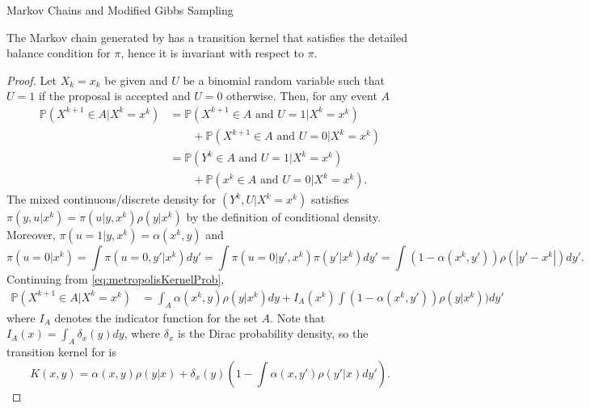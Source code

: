 \begin{chapter}{Markov Chains and Modified Gibbs Sampling}
\begin{prop} \label{prop:metropolisInvariance}
  The Markov chain generated by  has a transition kernel that satisfies the detailed balance condition for $\pi$, hence it is invariant with respect to $\pi$.
\end{prop}
\begin{proof}
Let $X_k=x_k$ be given and $U$ be a binomial random variable such that $U=1$ if the proposal is accepted and $U=0$ otherwise. 
Then, for any event $A$ 
\begin{align}
  \mathbb P\left( X^{k+1} \in A | X^k = x^k \right)
    &= \mathbb P\left( X^{k+1} \in A\text{ and } U = 1 |X^k=x^k \right) \nonumber\\
    &\quad\quad+ \mathbb P\left(X^{k+1} \in A\text{ and } U = 0| X^k=x^k \right) \nonumber \\
    &= \mathbb P\left( Y^k \in A\text{ and } U = 1 |X^k=x^k \right) \nonumber\\
    &\quad\quad+ \mathbb P\left(x^k \in A\text{ and } U = 0| X^k=x^k \right). \label{eq:metropolisKernelProb}
\end{align}
The mixed continuous/discrete density for $(Y^k,U|X^k = x^k)$ satisfies $\pi(y,u|x^k) = \pi(u|y,x^k)\rho(y|x^k)$ by the definition of conditional density.  
Moreover, $\pi(u=1|y,x^k) = \alpha(x^k,y)$ and 
\begin{equation*}
  \pi(u=0|x^k) = \int \pi(u=0,y'|x^k)dy' = \int \pi(u=0|y',x^k)\pi(y'|x^k)dy' = \int (1-\alpha(x^k,y'))\rho(|y'-x^k|)dy'.
\end{equation*}
Continuing from \eqref{eq:metropolisKernelProb},
\begin{align}
  \mathbb P\left( X^{k+1} \in A | X^k = x^k \right)
    &= \int_A \alpha(x^k,y)\rho(y|x^k)dy + I_A(x^k) \int (1 - \alpha(x^k,y'))\rho(y|x^k))dy'
\end{align}
where $I_A$ denotes the indicator function for the set $A$.
Note that $I_A(x) = \int_A \delta_x(y)dy$, where $\delta_x$ is the Dirac probability density, so the transition kernel for  is
\begin{equation} \label{eq:metropolisKernel}
  K(x,y) = \alpha(x,y)\rho(y|x) + \delta_x(y) \left(1 - \int \alpha(x,y')\rho(y'|x)dy'\right).
\end{equation}


\end{proof}
\end{chapter}
